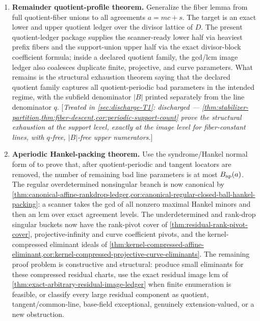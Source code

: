 \documentclass[11pt]{article}
\theoremstyle{definition}
\theoremstyle{remark}
\begin{document}
\begin{enumerate}[label=\textbf{T\arabic*.},leftmargin=2.5em]
\item \textbf{Remainder quotient-profile theorem.}  Generalize the fiber lemma
from full quotient-fiber unions to all agreements $a=mc+s$.  The target is an
exact lower and upper quotient ledger over the divisor lattice of $D$.  The present quotient-ledger package supplies the scanner-ready lower half via heaviest prefix fibers and the
support-union upper half via the exact divisor-block coefficient formula; inside
a declared quotient family, the gcd/lcm image ledger also coalesces duplicate
finite, projective, and curve parameters.  What remains is the structural
exhaustion theorem saying that the declared quotient family captures all
quotient-periodic bad parameters in the intended regime, with the subfield
denominator $|B|$ printed separately from the line denominator $q$. [\emph{Treated in \cref{sec:discharge-T1}: discharged --- \cref{thm:stabilizer-partition,thm:fiber-descent,cor:periodic-support-count} prove the structural exhaustion at the support level, exactly at the image level for fiber-constant lines, with $q$-free, $|B|$-free upper numerators.}]

\item \textbf{Aperiodic Hankel-packing theorem.}  Use the syndrome/Hankel normal
form of \cite{Cho26b} to prove that, after quotient-periodic and tangent
locators are removed, the number of remaining bad line parameters is at most
$B_{\rm ap}(a)$.  The regular overdetermined nonsingular branch is now
canonical by \cref{thm:canonical-affine-rankdrop-ledger,cor:canonical-regular-closed-ball-hankel-packing}: a scanner takes the gcd of all nonzero maximal
Hankel minors and then an lcm over exact agreement levels.  The underdetermined
and rank-drop singular buckets now have the rank-pivot cover of
\cref{thm:residual-rank-pivot-cover}, projective-infinity and curve coefficient
pivots, and the kernel-compressed eliminant ideals of
\cref{thm:kernel-compressed-affine-eliminant,cor:kernel-compressed-projective-curve-eliminants}.  The remaining proof problem is constructive and structural:
produce small eliminants for these compressed residual charts, use the exact
residual image lcm of \cref{thm:exact-arbitrary-residual-image-ledger} when
finite enumeration is feasible, or classify every large residual component as
quotient, tangent/common-line, base-field exceptional, genuinely extension-valued,
or a new obstruction.


\end{enumerate}
\end{document}
